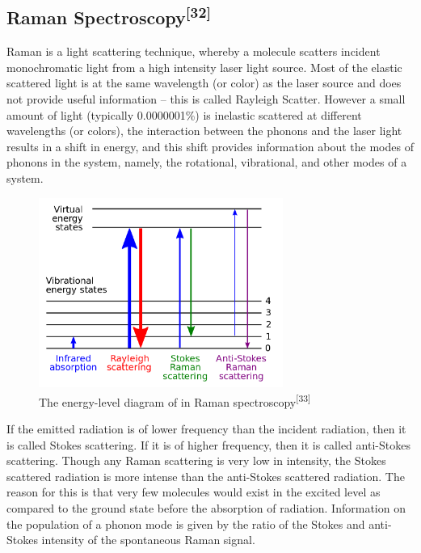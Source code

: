 \subsection{Raman Spectroscopy\textsuperscript{[32]}}
Raman is a light scattering technique, whereby a molecule scatters incident monochromatic light from a high intensity laser light source. Most of the elastic scattered light is at the same wavelength (or color) as the laser source and does not provide useful information – this is called Rayleigh Scatter. However a small amount of light (typically 0.0000001\%) is inelastic scattered at different wavelengths (or colors), the interaction between the phonons and the laser light results in a shift in energy, and this shift provides information about the modes of phonons in the system, namely, the rotational, vibrational, and other modes of a system.
\begin{figure}[H]
\centering
\includegraphics[width=8cm]{src/fig/fig29.png}
\caption{The energy-level diagram of  in Raman spectroscopy\textsuperscript{[33]}}
\end{figure}
If the emitted radiation is of lower frequency than the incident radiation, then it is called Stokes scattering.  If it is of higher frequency, then it is called anti-Stokes scattering. Though any Raman scattering is very low in intensity, the Stokes scattered radiation is more intense than the anti-Stokes scattered radiation. The reason for this is that very few molecules would exist in the excited level as compared to the ground state before the absorption of radiation. Information on the population of a phonon mode is given by the ratio of the Stokes and anti-Stokes intensity of the spontaneous Raman signal. 
